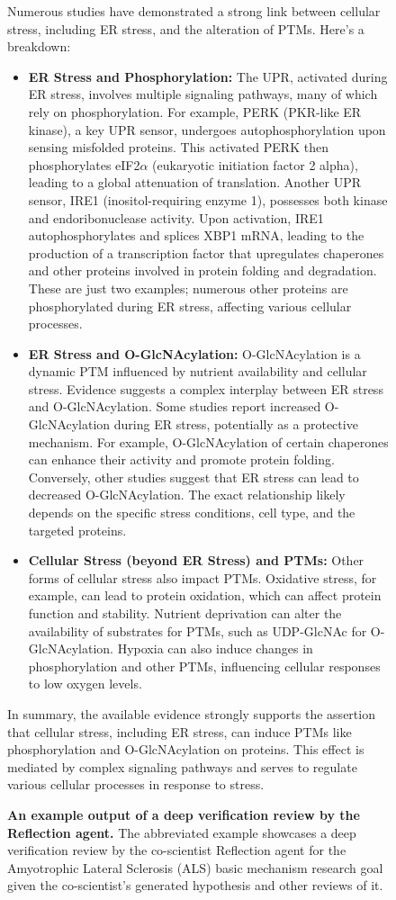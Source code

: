 \begin{figure}[htbp!]
\begin{tcolorbox}
Numerous studies have demonstrated a strong link between cellular stress, including ER stress, and the alteration of PTMs. Here's a breakdown:
\begin{itemize}
    \item \textbf{ER Stress and Phosphorylation:} The UPR, activated during ER stress, involves multiple signaling pathways, many of which rely on phosphorylation. For example, PERK (PKR-like ER kinase), a key UPR sensor, undergoes autophosphorylation upon sensing misfolded proteins. This activated PERK then phosphorylates eIF2$\alpha$ (eukaryotic initiation factor 2 alpha), leading to a global attenuation of translation. Another UPR sensor, IRE1 (inositol-requiring enzyme 1), possesses both kinase and endoribonuclease activity. Upon activation, IRE1 autophosphorylates and splices XBP1 mRNA, leading to the production of a transcription factor that upregulates chaperones and other proteins involved in protein folding and degradation. These are just two examples; numerous other proteins are phosphorylated during ER stress, affecting various cellular processes.
    \item \textbf{ER Stress and O-GlcNAcylation:} O-GlcNAcylation is a dynamic PTM influenced by nutrient availability and cellular stress. Evidence suggests a complex interplay between ER stress and O-GlcNAcylation. Some studies report increased O-GlcNAcylation during ER stress, potentially as a protective mechanism. For example, O-GlcNAcylation of certain chaperones can enhance their activity and promote protein folding. Conversely, other studies suggest that ER stress can lead to decreased O-GlcNAcylation. The exact relationship likely depends on the specific stress conditions, cell type, and the targeted proteins.
    \item \textbf{Cellular Stress (beyond ER Stress) and PTMs:} Other forms of cellular stress also impact PTMs. Oxidative stress, for example, can lead to protein oxidation, which can affect protein function and stability. Nutrient deprivation can alter the availability of substrates for PTMs, such as UDP-GlcNAc for O-GlcNAcylation. Hypoxia can also induce changes in phosphorylation and other PTMs, influencing cellular responses to low oxygen levels.
\end{itemize}
In summary, the available evidence strongly supports the assertion that cellular stress, including ER stress, can induce PTMs like phosphorylation and O-GlcNAcylation on proteins. This effect is mediated by complex signaling pathways and serves to regulate various cellular processes in response to stress.\\
\end{tcolorbox}
\vspace{0.1cm}
\caption{\textbf{An example output of a deep verification review by the Reflection agent.} The abbreviated example showcases a deep verification review by the co-scientist Reflection agent for the Amyotrophic Lateral Sclerosis (ALS) basic mechanism research goal given the co-scientist's generated hypothesis and other reviews of it.}
\label{fig:ex_deep_verification}
\end{figure}

